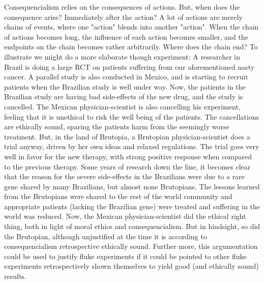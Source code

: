 \documentclass[12p]{article}
\begin{document}
Consequencialism relies on the consequences of actions.
But, when does the consequence arise?
Immediately after the action?
A lot of actions are merely chains of events, where one "action" blends into another "action".
When the chain of actions becomes long, the influence of each action becomes smaller, and the endpoints on the chain becomes rather arbitrarily.
Where does the chain end?
To illustrate we might do a more elaborate though experiment:
A researcher in Brazil is doing a large RCT on patients suffering from our aforementioned nasty cancer.
A parallel study is also conducted in Mexico, and is starting to recruit patients when the Brazilian study is well under way.
Now, the patients in the Brazilian study are having bad side-effects of the new drug, and the study is cancelled.
The Mexican physician-scientist is also cancelling his experiment, feeling that it is unethical to risk the well being of the patients.
The cancellations are ethically sound, sparing the patients harm from the seemingly worse treatment.
But, in the land of  Brutopia, a Brutopian physician-scientist does a trial anyway, driven by her own ideas and relaxed regulations.
The trial goes very well in favor for the new therapy, with strong positive response when compared to the previous therapy.
Some years of research down the line, it becomes clear that the reason for the severe side-effects in the Brazilians were due to a rare gene shared by many Brazilians, but almost none Brutopians.
The lessons learned from the Brutopians were shared to the rest of the world community and appropriate patients (lacking the Brazilian gene) were treated and suffering in the world was reduced.
Now, the Mexican physician-scientist did the ethical right thing, both in light of moral ethics and consequencialism.
But in hindsight, so did the Brutopian, although unjustified at the time it is according to consequencialism retrospective ethically sound.
Further more, this argumentation could be used to justify fluke experiments if it could be pointed to other fluke experiments retrospectively shown themselves to yield good (and ethically sound) results.
\end{document}
